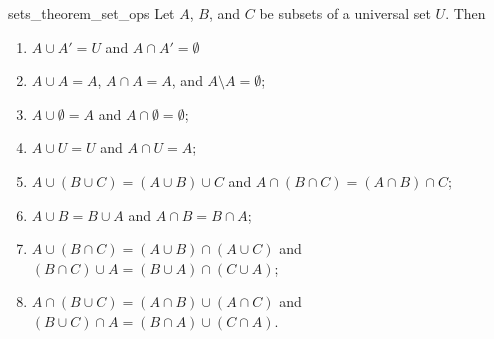 \begin{prop}{sets_theorem_set_ops}
Let $A$, $B$, and $C$ be subsets of a universal set $U$. Then
\begin{enumerate}
 
\item
$A \cup A' = U$ and $A \cap A' = \emptyset$

\item
$A \cup A = A$, $A \cap A = A$, and $A \setminus A = \emptyset$;
 
\item
$A \cup \emptyset = A$ and $A \cap \emptyset = \emptyset$;

\item
$A \cup U = U$ and $A \cap U = A$;
 
\item
$A \cup (B \cup C) = (A \cup B) \cup C$ and  $A \cap (B \cap C) = (A \cap B) \cap C$;
 
\item
$A \cup B = B \cup A$ and $A \cap B = B \cap A$;
 
\item
$A \cup (B \cap C) = (A \cup B) \cap (A \cup C)$ and $ (B \cap C) \cup A = (B \cup A) \cap (C \cup A)$;

 
\item
$A \cap (B \cup C) = (A \cap B) \cup (A \cap C)$ and $(B \cup C)  \cap A= (B \cap A) \cup (C \cap A)$.
 
\end{enumerate}
\end{prop}



